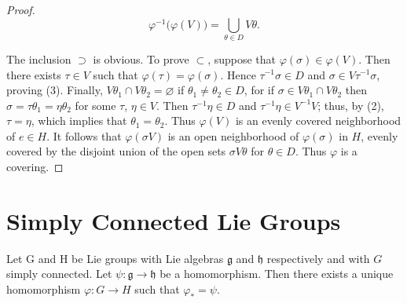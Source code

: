 \begin{proof}
\begin{equation}
\tag{3}\label{eq:3.26:3}
\varphi^{-1}\bigl(\varphi(V)\bigr)=\bigcup_{\theta\in D}V\theta.
\end{equation}

The inclusion $\supset$ is obvious. To prove $\subset$, suppose that $\varphi(\sigma) \in \varphi(V)$. Then there exists $\tau \in V$ such that $\varphi(\tau) = \varphi(\sigma)$. Hence $\tau^{-1}\sigma \in D$ and $\sigma \in V\tau^{-1}\sigma$, proving (3). Finally, $V\theta_1 \cap V\theta_2 = \varnothing$ if $\theta_1 \neq \theta_2 \in D$, for if $\sigma \in V\theta_1 \cap V\theta_2$ then $\sigma = \tau\theta_1 = \eta\theta_2$ for some $\tau$, $\eta \in V$. Then $\tau^{-1}\eta \in D$ and $\tau^{-1}\eta \in V^{-1}V$; thus, by (2), $\tau = \eta$, which implies that $\theta_1 = \theta_2$. Thus $\varphi(V)$ is an evenly covered neighborhood of $e \in H$. It follows that $\varphi(\sigma V)$ is an open neighborhood of $\varphi(\sigma)$ in $H$, evenly covered by the disjoint union of the open sets $\sigma V\theta$ for $\theta \in D$. Thus $\varphi$ is a covering.

\end{proof}

\section{Simply Connected Lie Groups}

\begin{theorem}\label{thm:3.27}
Let G and H be Lie groups with Lie algebras $\mathfrak{g}$ and $\mathfrak{h}$ respectively and with $G$ simply connected. Let $\psi\colon\mathfrak{g}\to\mathfrak{h}$ be a homomorphism. Then there exists a unique homomorphism $\varphi\colon G\to H$ such that $\varphi_{*}=\psi$.

\end{theorem}

